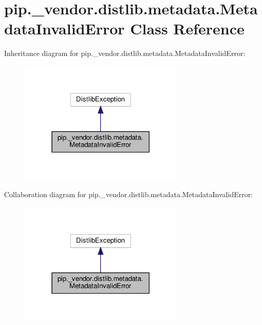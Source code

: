 \hypertarget{classpip_1_1__vendor_1_1distlib_1_1metadata_1_1MetadataInvalidError}{}\section{pip.\+\_\+vendor.\+distlib.\+metadata.\+Metadata\+Invalid\+Error Class Reference}
\label{classpip_1_1__vendor_1_1distlib_1_1metadata_1_1MetadataInvalidError}


Inheritance diagram for pip.\+\_\+vendor.\+distlib.\+metadata.\+Metadata\+Invalid\+Error\+:
\nopagebreak
\begin{figure}[H]
\begin{center}
\leavevmode
\includegraphics[width=222pt]{classpip_1_1__vendor_1_1distlib_1_1metadata_1_1MetadataInvalidError__inherit__graph}
\end{center}
\end{figure}


Collaboration diagram for pip.\+\_\+vendor.\+distlib.\+metadata.\+Metadata\+Invalid\+Error\+:
\nopagebreak
\begin{figure}[H]
\begin{center}
\leavevmode
\includegraphics[width=222pt]{classpip_1_1__vendor_1_1distlib_1_1metadata_1_1MetadataInvalidError__coll__graph}
\end{center}
\end{figure}


